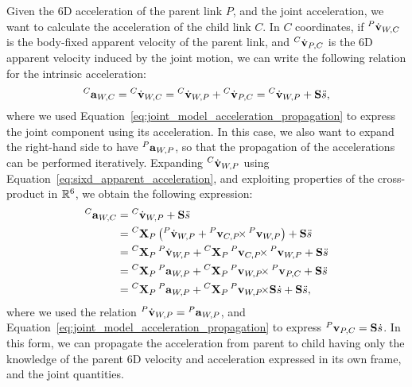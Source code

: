 \begin{definition*}
\label{definition:propagation_accelerations}
%
Given the 6D acceleration of the parent link $P$, and the joint acceleration, we want to calculate the acceleration of the child link $C$.
In $C$ coordinates, if $\velsixd[P]_{W,C}$ is the body-fixed apparent velocity of the parent link, and $\velsixd[C]_{P,C}$ is the 6D apparent velocity induced by the joint motion, we can write the following relation for the intrinsic acceleration:
%
\begin{equation*}
    \accsix[C]_{W,C} = \velsixd[C]_{W,C}
    = \velsixd[C]_{W,P} + \velsixd[C]_{P,C} = \velsixd[C]_{W,P} + \subspace \ddot{\shape}
    ,
\end{equation*}
%
where we used Equation~\eqref{eq:joint_model_acceleration_propagation} to express the joint component using its acceleration.
In this case, we also want to expand the right-hand side to have $\accsix[P]_{W,P}$, so that the propagation of the accelerations can be performed iteratively.
Expanding $\velsixd[C]_{W,P}$ using Equation~\eqref{eq:sixd_apparent_acceleration}, and exploiting properties of the cross-product in $\realn^6$, we obtain the following expression:
%
\begin{align*}
    \accsix[C]_{W,C}
    &= \velsixd[C]_{W,P} + \subspace \ddot{\shape} \\
    &= \transvel[C]_P \left( \velsixd[P]_{W,P} + \crossvelsix[{\velsix[P]_{C,P}}] \velsix[P]_{W,P} \right) + \subspace \ddot{\shape} \\
    &= \transvel[C]_P \velsixd[P]_{W,P} + \transvel[C]_P \crossvelsix[{\velsix[P]_{C,P}}] \velsix[P]_{W,P} + \subspace \ddot{\shape} \\
    &= \transvel[C]_P \accsix[P]_{W,P} + \transvel[C]_P \crossvelsix[{\velsix[P]_{W,P}}] \velsix[P]_{P,C} + \subspace \ddot{\shape} \\
    &= \transvel[C]_P \accsix[P]_{W,P} + \transvel[C]_P \crossvelsix[{\velsix[P]_{W,P}}] \subspace \dot{s} + \subspace \ddot{\shape}
    ,
\end{align*}
%
where we used the relation $\velsixd[P]_{W,P} = \accsix[P]_{W,P}$, and Equation~\eqref{eq:joint_model_acceleration_propagation} to express $\velsix[P]_{P,C} = \subspace \dot{\shape}$.
In this form, we can propagate the acceleration from parent to child having only the knowledge of the parent 6D velocity and acceleration expressed in its own frame, and the joint quantities.
%
\end{definition*}

